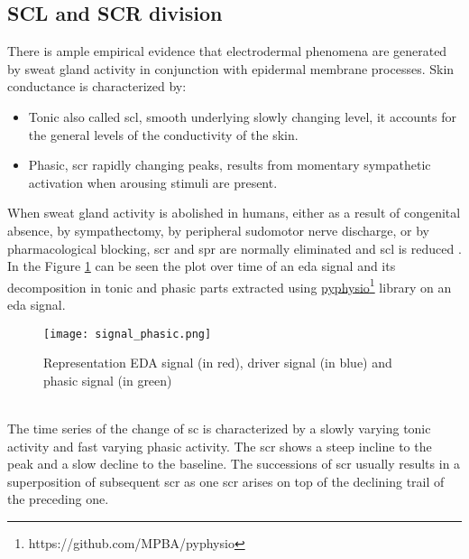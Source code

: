 \subsection{SCL and SCR division}
There is ample empirical evidence that electrodermal phenomena are generated by sweat gland activity in conjunction with epidermal membrane processes. Skin conductance is characterized by:
\begin{itemize}
	\item Tonic also called \gls{scl}, smooth underlying slowly changing level, it accounts for the general levels of the conductivity of the skin.
	\item Phasic, \gls{scr} rapidly changing peaks, results from momentary sympathetic activation when arousing stimuli are present.
\end{itemize}
When sweat gland activity is abolished in humans, either as a result of congenital absence, by sympathectomy, by peripheral sudomotor nerve discharge, or by pharmacological blocking, \gls{scr} and \gls{spr} are normally eliminated and \gls{scl} is reduced \cite{fowles1993electrodermal}.
\\ \indent
In the Figure \ref{fig:signal_phasic} can be seen the plot over time of an \gls{eda} signal and its decomposition in tonic and phasic parts extracted using  \href{https://github.com/MPBA/pyphysio}{pyphysio}\footnote{https://github.com/MPBA/pyphysio} library \cite{bizzego2019pyphysio} on an \gls{eda} signal. 
\begin{figure}[h]
    \centering
    \texttt{[image: signal\_phasic.png]} 
	\caption{Representation EDA signal (in red), driver signal (in blue) and phasic signal (in green)}
    \label{fig:signal_phasic}
\end{figure}
\\
The time series of the change of \gls{sc} is characterized by a slowly varying tonic activity and fast varying phasic activity. The \gls{scr} shows a steep incline to the peak and a slow decline to the baseline. The successions of \gls{scr} usually results in a superposition of subsequent \gls{scr} as one \gls{scr} arises on top of the declining trail of the preceding one.
